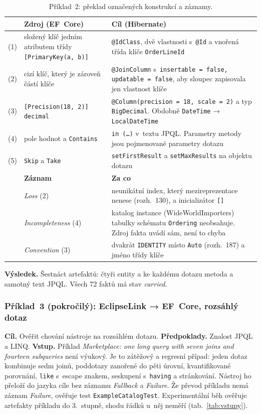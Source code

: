 \begin{table}[H]
\centering\footnotesize
\begin{tabularx}{\textwidth}{L{0.6cm} L{5cm} Y}
\toprule
& \textbf{Zdroj (EF~Core)} & \textbf{Cíl (Hibernate)} \\
\midrule
(1) & složený klíč jedním atributem třídy \texttt{[PrimaryKey(a, b)]} & \texttt{@IdClass}, dvě vlastnosti s~\texttt{@Id} a vnořená třída klíče \texttt{OrderLineId} \\
(2) & cizí klíč, který je zároveň částí klíče & \texttt{@JoinColumn} s~\texttt{insertable = false, updatable = false}, aby sloupec zapisovala jen vlastnost klíče \\
(3) & \texttt{[Precision(18, 2)] decimal} & \texttt{@Column(precision = 18, scale = 2)} a typ \texttt{BigDecimal}. Obdobně \texttt{DateTime} → \texttt{LocalDateTime} \\
(4) & pole hodnot a \texttt{Contains} & \texttt{in (\ldots)} v~textu JPQL. Parametry metody jsou pojmenované parametry dotazu \\
(5) & \texttt{Skip} a \texttt{Take} & \texttt{setFirstResult} a \texttt{setMaxResults} na objektu dotazu \\
\midrule
& \textbf{Záznam} & \textbf{Za co} \\
\midrule
& \emph{Loss} (2) & neunikátní index, který mezireprezentace nenese (rozh.~130), a inicializátor \texttt{[]} \\
& \emph{Incompleteness} (4) & katalog instance (WideWorldImporters) tabulky schématu \texttt{Ordering} neobsahuje. Zdroj fakta uvádí sám, není to chyba \\
& \emph{Convention} (3) & dvakrát \texttt{IDENTITY} místo \texttt{Auto} (rozh.~187) a jméno třídy klíče \\
\bottomrule
\end{tabularx}%
\caption{Příklad~2: překlad označených konstrukcí a záznamy.}
\label{tab:ex2}
\end{table}

\textbf{Výsledek.} Šestnáct artefaktů: čtyři entity a ke každému dotazu metoda a samotný text JPQL. Všech 72 faktů má stav \emph{carried}.

\subsubsection*{Příklad~3 (pokročilý): EclipseLink → EF~Core, rozsáhlý dotaz}

\textbf{Cíl.} Ověřit chování nástroje na rozsáhlém dotazu. \textbf{Předpoklady.} Znalost JPQL a LINQ. \textbf{Vstup.} Příklad \emph{Marketplace: one long query with seven joins and fourteen subqueries} není výukový. Je to zátěžový a regresní případ: jeden dotaz kombinuje sedm joinů, poddotazy zanořené do pěti úrovní, kvantifikované porovnání, \texttt{like} s~escape znakem, seskupení s~\texttt{having} a stránkování. Nástroj ho přeloží do jazyka cíle bez záznamu \emph{Fallback} a \emph{Failure}. Že převod příkladu nemá záznam \emph{Failure}, ověřuje test \texttt{ExampleCatalogTest}. Experimentální běh ověřuje artefakty příkladu do 3.~stupně, shodu řádků u~něj neměří (tab.~\ref{tab:vstupy}).

